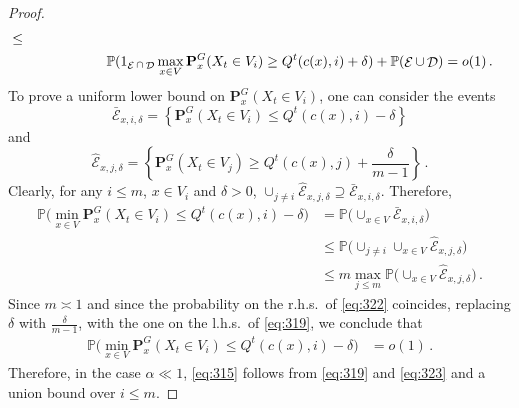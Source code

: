 \documentclass[10pt,a4paper]{amsart}
\DeclareMathOperator{\cD}{\mathcal{D}}
\DeclareMathOperator{\cE}{\mathcal{E}}
\newcommand{\lhs}{{l.h.s.~}}
\newcommand{\one}{\textup{\textbf{1}}}
\newcommand{\p}{\mathbb{P}}
\newcommand{\quenchG}{\mathbf{P}^G}
\newcommand{\rhs}{{r.h.s.~}}
\newcommand{\semi}{{Q}}
\begin{document}
\begin{proof}
\begin{equation}
\begin{split}
				\le \\
                &\qquad\qquad \qquad\p(\one_{\cE\cap\cD}\max_{x \in V}\quenchG_x(X_t\in V_i)\ge \semi^t(c(x),i)+ \delta)+\p(\cE\cup\cD)=o(1)\,.
                \end{split}
			\end{equation}
            			To prove a uniform lower bound on $\quenchG_x(X_t\in V_i)$, one can consider the events
            \begin{equation}
        \bar{\mathcal{E}}_{x,i,\delta}=\left\{ \quenchG_x(X_t\in V_i)\le\semi^t(c(x),i)- \delta\right\}
            \end{equation}
            and
\begin{equation}
\hat{\mathcal{E}}_{x,j,\delta}=\left\{\quenchG_x(X_t\in V_j)\ge\semi^t(c(x),j)+   \frac{\delta}{m-1}\right\}\,.
            \end{equation}
Clearly, for any $i\le m$, $x\in V_i$ and $\delta>0$,  $\cup_{j\neq i}\hat{\mathcal{E}}_{x,j,\delta}\supseteq\bar{\mathcal{E}}_{x,i,\delta} $.
Therefore,
\begin{equation}\label{eq:322}
    \begin{split}
        \p\big(\min_{x \in V}\quenchG_x(X_t\in V_i)\le \semi^t(c(x),i)-\delta\big)&= \p\big(\cup_{x\in V}\bar{\mathcal{E}}_{x,i,\delta}\big)\\
        &\le\p\big(\cup_{j\neq i}\cup_{x\in V}\hat{\mathcal{E}}_{x,j,\delta}\big)\\
        &\le m\max_{j\le m}\p\big(\cup_{x\in V}\hat{\mathcal{E}}_{x,j,\delta}\big)\,.
    \end{split}
\end{equation}
Since $m\asymp 1$ and since the probability on the \rhs of \eqref{eq:322} coincides, replacing $\delta$ with $\frac{\delta}{m-1}$, with the one on the \lhs of \eqref{eq:319}, we conclude that
\begin{equation}\label{eq:323}
    \begin{split}
        \p\big(\min_{x \in V}\quenchG_x(X_t\in V_i)\le \semi^t(c(x),i)-\delta\big)&= o(1)\,.
    \end{split}
\end{equation}
Therefore, in the case $\alpha\ll1$, \eqref{eq:315} follows from \eqref{eq:319} and \eqref{eq:323} and a union bound over $i\le m$.


\end{proof}
\end{document}
